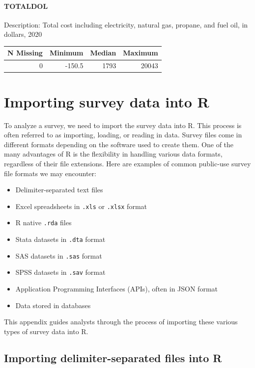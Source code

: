 \documentclass[
]{krantz}
\providecommand{\tightlist}{%
  \setlength{\itemsep}{0pt}\setlength{\parskip}{0pt}}
\begin{document}
\hypertarget{totaldol}{%
\subsubsection*{TOTALDOL}\label{totaldol}}


Description: Total cost including electricity, natural gas, propane, and fuel oil, in dollars, 2020

\begin{tabular}[t]{r|r|r|r}
\hline
N Missing & Minimum & Median & Maximum\\
\hline
0 & -150.5 & 1793 & 20043\\
\hline
\end{tabular}

\hypertarget{importing-survey-data-into-r}{%
\chapter{Importing survey data into R}\label{importing-survey-data-into-r}}

To analyze a survey, we need to import the survey data into R. This process is often referred to as importing, loading, or reading in data. Survey files come in different formats depending on the software used to create them. One of the many advantages of R is the flexibility in handling various data formats, regardless of their file extensions. Here are examples of common public-use survey file formats we may encounter:

\begin{itemize}
\tightlist
\item
  Delimiter-separated text files
\item
  Excel spreadsheets in \texttt{.xls} or \texttt{.xlsx} format
\item
  R native \texttt{.rda} files
\item
  Stata datasets in \texttt{.dta} format
\item
  SAS datasets in \texttt{.sas} format
\item
  SPSS datasets in \texttt{.sav} format
\item
  Application Programming Interfaces (APIs), often in JSON format
\item
  Data stored in databases
\end{itemize}

This appendix guides analysts through the process of importing these various types of survey data into R.

\hypertarget{importing-delimiter-separated-files-into-r}{%
\section{Importing delimiter-separated files into R}\label{importing-delimiter-separated-files-into-r}}
\end{document}
